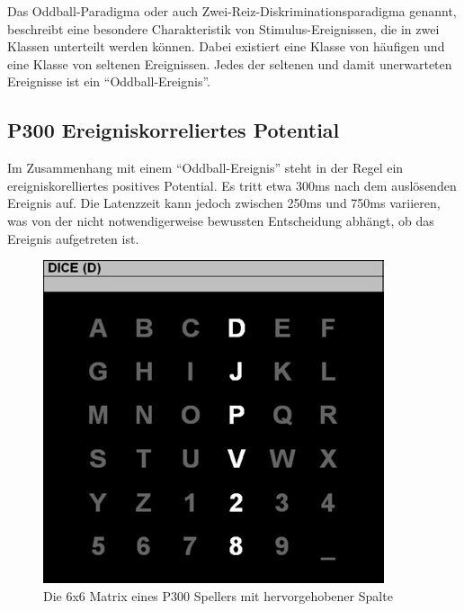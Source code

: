 Das Oddball-Paradigma oder auch Zwei-Reiz-Diskriminationsparadigma \cite[S.9]{paehge2006verschiedenen} genannt, 
beschreibt eine besondere Charakteristik von Stimulus-Ereignissen, die in zwei Klassen unterteilt werden können.
Dabei existiert eine Klasse von häufigen und eine Klasse von seltenen Ereignissen. 
Jedes der seltenen und damit unerwarteten Ereignisse ist ein "`Oddball-Ereignis"'.\\



\subsection{P300 Ereigniskorreliertes Potential}
\vspace{0.3cm}

Im Zusammenhang mit einem "`Oddball-Ereignis"' steht in der Regel ein ereigniskorelliertes positives Potential.
Es tritt etwa 300ms nach dem auslösenden Ereignis auf. 
Die Latenzzeit kann jedoch zwischen 250ms und 750ms variieren, was von der nicht notwendigerweise bewussten Entscheidung abhängt, ob das Ereignis aufgetreten ist.\\

\begin{figure}[h!]
\begin{center}
\includegraphics[scale=0.6]{images/P300Speller.jpg}
\caption{Die 6x6 Matrix eines P300 Spellers mit hervorgehobener Spalte}
\label{P300Speller}
\end{center}
\end{figure}

